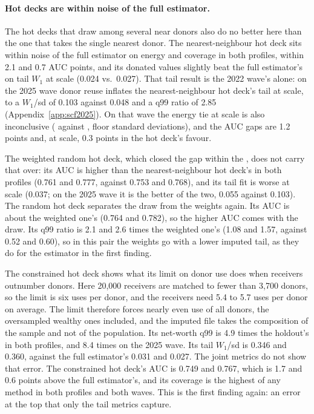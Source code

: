 \paragraph{Hot decks are within noise of the full estimator.} The hot decks
that draw among several near donors also do no better here than the one that
takes the single nearest donor. The
nearest-neighbour hot deck sits within noise of the full estimator on energy and coverage in both
profiles, within 2.1 and 0.7 AUC points, and its donated values slightly
beat the full estimator's on tail $W_1$ at scale (0.024 vs.\ 0.027). That
tail result is the 2022 wave's alone: on the 2025 wave donor reuse inflates
the nearest-neighbour hot deck's tail at scale, to a $W_1$/sd of 0.103
against 0.048 and a q99 ratio of 2.85 (Appendix~\ref{app:scf2025}). On that
wave the energy tie at scale is also inconclusive
( against ,
 floor standard deviations), and the AUC
gaps are 1.2 points and, at scale, 0.3 points in the hot deck's favour.

The weighted random hot deck, which closed the gap within the \scf{}, does
not carry that over: its AUC is higher than the nearest-neighbour hot deck's
in both profiles (0.761 and 0.777, against 0.753 and 0.768), and its tail
fit is worse at scale (0.037; on the 2025 wave it is the better of the two,
0.055 against 0.103). The random hot deck separates the draw from the
weights again. Its AUC is about the weighted one's (0.764 and 0.782), so
the higher AUC comes with the draw. Its q99 ratio is 2.1 and 2.6 times the
weighted one's (1.08 and 1.57, against 0.52 and 0.60), so in this pair the
weights go with a lower imputed tail, as they do for the estimator in the
first finding.

The constrained hot deck shows what its limit on donor use does when
receivers outnumber donors. Here 20,000 receivers are matched to fewer than
3,700 donors, so the limit is six uses per donor, and the receivers need 5.4
to 5.7 uses per donor on average. The limit therefore forces nearly even use
of all donors, the oversampled wealthy ones included, and the imputed file
takes the composition of the sample and not of the population. Its
net-worth q99 is 4.9 times the holdout's in both profiles, and 8.4 times on
the 2025 wave. Its tail $W_1$/sd is 0.346 and 0.360, against the full
estimator's 0.031 and 0.027. The joint metrics do not show that error. The
constrained hot deck's AUC is 0.749 and 0.767, which is 1.7 and 0.6 points
above the full estimator's, and its coverage is the highest of any method in
both profiles and both waves. This is the first finding again: an error at
the top that only the tail metrics capture.

